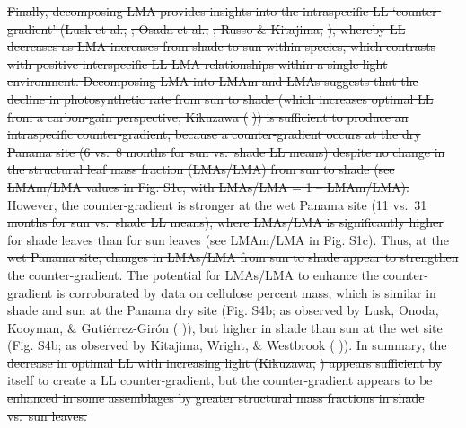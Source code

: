 \documentclass[12pt,]{article}
\theoremstyle{definition}
\theoremstyle{definition}
\theoremstyle{definition}
\theoremstyle{remark}
\providecommand{\DIFdeltex}[1]{{\protect\color{red}\sout{#1}}}                      %
\providecommand{\DIFdelbegin}{} %
\providecommand{\DIFdel}[1]{\texorpdfstring{\DIFdeltex{#1}}{}} %
\newcommand{\DIFscaledelfig}{0.5}
\newlength{\DIFdelgraphicswidth} %
\newlength{\DIFdelgraphicsheight} %
\newcommand{\DIFdelincludegraphics}[2][]{%
\sbox{\DIFdelgraphicsbox}{\DIFOincludegraphics[#1]{#2}}%
\settoboxwidth{\DIFdelgraphicswidth}{\DIFdelgraphicsbox} %
\settoboxtotalheight{\DIFdelgraphicsheight}{\DIFdelgraphicsbox} %
\scalebox{\DIFscaledelfig}{%
\parbox[b]{\DIFdelgraphicswidth}{\usebox{\DIFdelgraphicsbox}\\[-\baselineskip] \rule{\DIFdelgraphicswidth}{0em}}\llap{\resizebox{\DIFdelgraphicswidth}{\DIFdelgraphicsheight}{%
\setlength{\unitlength}{\DIFdelgraphicswidth}%
\begin{picture}(1,1)%
\thicklines\linethickness{2pt} %
{\color[rgb]{1,0,0}\put(0,0){\framebox(1,1){}}}%
{\color[rgb]{1,0,0}\put(0,0){\line( 1,1){1}}}%
{\color[rgb]{1,0,0}\put(0,1){\line(1,-1){1}}}%
\end{picture}%
}\hspace*{3pt}}} %
} %
\DeclareRobustCommand{\DIFdelbegin}{\DIFOdelbegin \let\includegraphics\DIFdelincludegraphics} %
\begin{document}
\begin{itemize}
\DIFdelbegin \DIFdel{Finally, decomposing LMA provides insights into the intraspecific LL
`counter-gradient' (Lusk et al., }%
\DIFdel{;
Osada et al., }%
\DIFdel{; Russo \&
Kitajima, }%
\DIFdel{), whereby LL decreases
as LMA increases from shade to sun within species, which contrasts with
positive interspecific LL-LMA relationships within a single light
environment. Decomposing LMA into LMAm and LMAs suggests that the
decline in photosynthetic rate from sun to shade (which increases
optimal LL from a carbon-gain perspective; Kikuzawa
(}%
\DIFdel{)) is sufficient to produce
an intraspecific counter-gradient, because a counter-gradient occurs at
the dry Panama site (6 vs.~8 months for sun vs.~shade LL means) despite
no change in the structural leaf mass fraction (LMAs/LMA) from sun to
shade (see LMAm/LMA values in Fig. S1c, with LMAs/LMA = 1 -- LMAm/LMA).
However, the counter-gradient is stronger at the wet Panama site (11
vs.~31 months for sun vs.~shade LL means), where LMAs/LMA is
significantly higher for shade leaves than for sun leaves (see LMAm/LMA
in Fig. S1c). Thus, at the wet Panama site, changes in LMAs/LMA from sun
to shade appear to strengthen the counter-gradient. The potential for
LMAs/LMA to enhance the counter-gradient is corroborated by data on
cellulose percent mass, which is similar in shade and sun at the Panama
dry site (Fig. S4b; as observed by Lusk, Onoda, Kooyman, \&
Gutiérrez-Girón (}%
\DIFdel{)), but higher in
shade than sun at the wet site (Fig. S4b; as observed by Kitajima,
Wright, \& Westbrook (}%
\DIFdel{)). In
summary, the decrease in optimal LL with increasing light (Kikuzawa,
}%
\DIFdel{) appears sufficient by itself
to create a LL counter-gradient, but the counter-gradient appears to be
enhanced in some assemblages by greater structural mass fractions in
shade vs.~sun leaves.
}%


\end{itemize}
\end{document}
